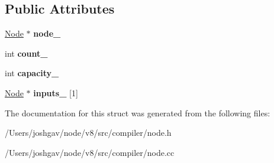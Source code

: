 \subsection*{Public Attributes}
\begin{DoxyCompactItemize}
\item 
\hyperlink{classv8_1_1internal_1_1compiler_1_1_node}{Node} $\ast$ {\bfseries node\+\_\+}\hypertarget{structv8_1_1internal_1_1compiler_1_1_node_1_1_out_of_line_inputs_a1d0020e72e4f4fb99e3fe8eb8f194446}{}\label{structv8_1_1internal_1_1compiler_1_1_node_1_1_out_of_line_inputs_a1d0020e72e4f4fb99e3fe8eb8f194446}

\item 
int {\bfseries count\+\_\+}\hypertarget{structv8_1_1internal_1_1compiler_1_1_node_1_1_out_of_line_inputs_a65ae0559d123de9ab813ebbfc464ec14}{}\label{structv8_1_1internal_1_1compiler_1_1_node_1_1_out_of_line_inputs_a65ae0559d123de9ab813ebbfc464ec14}

\item 
int {\bfseries capacity\+\_\+}\hypertarget{structv8_1_1internal_1_1compiler_1_1_node_1_1_out_of_line_inputs_a42a1f5932efdf1b33fa8dda24a3bbbcb}{}\label{structv8_1_1internal_1_1compiler_1_1_node_1_1_out_of_line_inputs_a42a1f5932efdf1b33fa8dda24a3bbbcb}

\item 
\hyperlink{classv8_1_1internal_1_1compiler_1_1_node}{Node} $\ast$ {\bfseries inputs\+\_\+} \mbox{[}1\mbox{]}\hypertarget{structv8_1_1internal_1_1compiler_1_1_node_1_1_out_of_line_inputs_a8b3fe281d8bef6e315a6726afdb777ff}{}\label{structv8_1_1internal_1_1compiler_1_1_node_1_1_out_of_line_inputs_a8b3fe281d8bef6e315a6726afdb777ff}

\end{DoxyCompactItemize}


The documentation for this struct was generated from the following files\+:\begin{DoxyCompactItemize}
\item 
/\+Users/joshgav/node/v8/src/compiler/node.\+h\item 
/\+Users/joshgav/node/v8/src/compiler/node.\+cc\end{DoxyCompactItemize}

